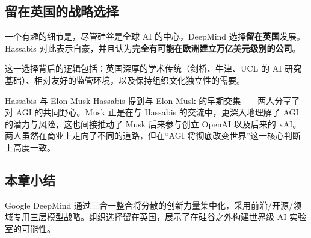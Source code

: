 \subsection{留在英国的战略选择}

一个有趣的细节是，尽管硅谷是全球 AI 的中心，DeepMind 选择\textbf{留在英国}发展。Hassabis 对此表示自豪，并且认为\textbf{完全有可能在欧洲建立万亿美元级别的公司}。

这一选择背后的逻辑包括：英国深厚的学术传统（剑桥、牛津、UCL 的 AI 研究基础）、相对友好的监管环境，以及保持组织文化独立性的需要。

\begin{knowledgebox}{Hassabis 与 Elon Musk}
Hassabis 提到与 Elon Musk 的早期交集——两人分享了对 AGI 的共同野心。Musk 正是在与 Hassabis 的交流中，更深入地理解了 AGI 的潜力与风险，这也间接推动了 Musk 后来参与创立 OpenAI 以及后来的 xAI。两人虽然在商业上走向了不同的道路，但在``AGI 将彻底改变世界''这一核心判断上高度一致。
\end{knowledgebox}

\subsection{本章小结}

Google DeepMind 通过三合一整合将分散的创新力量集中化，采用前沿/开源/领域专用三层模型战略。组织选择留在英国，展示了在硅谷之外构建世界级 AI 实验室的可能性。

